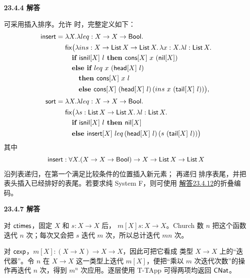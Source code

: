 \begin{taplsolutionentrybox}
\label{sol:translator:23.4.4}
\textbf{23.4.4 解答}

可采用插入排序。允许  时，完整定义如下：
\[
\begin{aligned}
\mathsf{insert}={}&\lambda X.\lambda leq:X\to X\to\mathsf{Bool}.\\
&\mathsf{fix}\bigl(\lambda ins:
 X\to\mathsf{List}\,X\to\mathsf{List}\,X.\,
 \lambda x:X.\lambda l:\mathsf{List}\,X.\\
&\quad\textbf{if }\mathsf{isnil}[X]\ l
 \textbf{ then }\mathsf{cons}[X]\ x\ (\mathsf{nil}[X])\\
&\quad\textbf{else if }leq\ x\ (\mathsf{head}[X]\ l)\\
&\qquad\textbf{then }\mathsf{cons}[X]\ x\ l\\
&\qquad\textbf{else }\mathsf{cons}[X]\ (\mathsf{head}[X]\ l)\,
  (ins\ x\ (\mathsf{tail}[X]\ l))\bigr),\\[1mm]
\mathsf{sort}={}&\lambda X.\lambda leq:X\to X\to\mathsf{Bool}.\\
&\mathsf{fix}\bigl(\lambda s:
 \mathsf{List}\,X\to\mathsf{List}\,X.\,
 \lambda l:\mathsf{List}\,X.\\
&\quad\textbf{if }\mathsf{isnil}[X]\ l
 \textbf{ then }\mathsf{nil}[X]\\
&\quad\textbf{else }\mathsf{insert}[X]\ leq\,
  (\mathsf{head}[X]\ l)\,
  (s\ (\mathsf{tail}[X]\ l))\bigr)
\end{aligned}
\]
其中
\[
\mathsf{insert}:
\forall X.(X\to X\to\mathsf{Bool})\to
X\to\mathsf{List}\,X\to\mathsf{List}\,X
\]
沿列表递归，在第一个满足比较条件的位置插入新元素； 再递归
排序表尾，并把表头插入已经排好的表尾。若要求纯 System F，则可使用
\hyperref[sol:author:23.4.12]{解答23.4.12}的折叠编码。
\end{taplsolutionentrybox}

\begin{taplsolutionentrybox}
\label{sol:translator:23.4.7}
\textbf{23.4.7 解答}

对 \(\mathsf{ctimes}\)，固定 \(X\) 和 \(s:X\to X\) 后，
\(m[X]s:X\to X\)。Church 数 \(n\) 把这个函数迭代 \(n\) 次；每次又会把
\(s\) 迭代 \(m\) 次，所以总计迭代 \(mn\) 次。

对 \(\mathsf{cexp}\)，\(m[X]: (X\to X)\to X\to X\)，因此可把它看成
类型 \(X\to X\) 上的“迭代器”。令 \(n\) 在 \(X\to X\) 这一类型上迭代
\(m[X]\)，便把“乘以 \(m\) 次迭代次数”的操作再迭代 \(n\) 次，得到
\(m^n\) 次应用。逐层使用 T-TApp 可得两项均返回 \(\mathsf{CNat}\)。
\end{taplsolutionentrybox}
